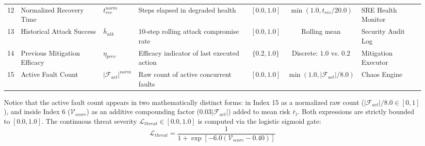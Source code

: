 \documentclass[11pt,a4paper]{article}
\begin{document}
\begin{table}[!t]
{\begin{tabular}{clllccl}
12 & Normalized Recovery Time & $t_{rec}^{norm}$ & Steps elapsed in degraded health & $[0.0, 1.0]$ & $\min(1.0, t_{rec} / 20.0)$ & SRE Health Monitor \\
13 & Historical Attack Success & $\bar{h}_{atk}$ & 10-step rolling attack compromise rate & $[0.0, 1.0]$ & Rolling mean & Security Audit Log \\
14 & Previous Mitigation Efficacy & $\eta_{prev}$ & Efficacy indicator of last executed action & $\{0.2, 1.0\}$ & Discrete: $1.0$ vs. $0.2$ & Mitigation Executor \\
15 & Active Fault Count & $|\mathcal{F}_{act}|^{norm}$ & Raw count of active concurrent faults & $[0.0, 1.0]$ & $\min(1.0, |\mathcal{F}_{act}| / 8.0)$ & Chaos Engine \\
\bottomrule
\end{tabular}}
\end{table}

Notice that the active fault count appears in two mathematically distinct forms: in Index 15 as a normalized raw count ($|\mathcal{F}_{act}|/8.0 \in [0, 1]$), and inside Index 6 ($\mathcal{V}_{score}$) as an additive compounding factor ($0.03|\mathcal{F}_{act}|$) added to mean risk $\bar{r}_t$. Both expressions are strictly bounded to $[0.0, 1.0]$. The continuous threat severity $\mathcal{L}_{threat} \in [0.0, 1.0]$ is computed via the logistic sigmoid gate:
\begin{equation}
    \mathcal{L}_{threat} = \frac{1}{1 + \exp\left[-6.0\left(\mathcal{V}_{score} - 0.40\right)\right]}
\end{equation}
\end{document}
